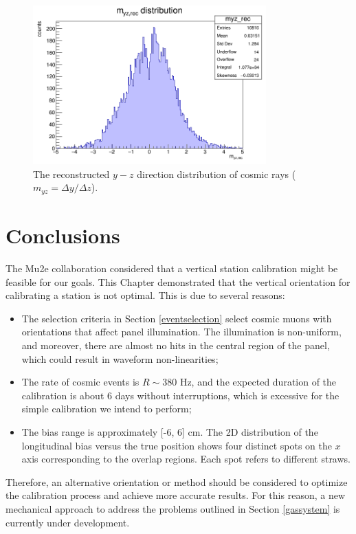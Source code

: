 \begin{figure}[!h]
    \centering
    \includegraphics[width=0.8\textwidth]{figures/png/myz_rec.png}
    \caption[The reconstructed $y-z$ direction distribution of cosmic rays.]{The reconstructed $y-z$ direction distribution of cosmic rays ($m_{yz}=\Delta y /\Delta z$).}
    \label{fig:myzrec}
\end{figure}
\section{Conclusions}
The Mu2e collaboration considered 
that a vertical station calibration might be 
feasible for our goals.
This Chapter demonstrated that the vertical orientation for calibrating a station is not optimal. This is due to several reasons:
\begin{itemize}
    \item The selection criteria in Section \ref{eventselection} select cosmic muons with orientations that affect panel illumination. 
    The illumination is non-uniform, and moreover, there are almost no hits in the central region of the panel, which could result in waveform non-linearities;
    \item The rate of cosmic events is $R \sim 380$ Hz, and the expected duration of the calibration is about 6 days without interruptions, 
    which is excessive for the simple calibration we intend to perform;
    \item The bias range is approximately [-6, 6] cm. The 2D distribution of the longitudinal bias versus the true position shows 
    four distinct spots on the $x$ axis corresponding to the overlap regions. Each spot refers to different straws.
\end{itemize}
Therefore, an alternative orientation or method should be considered to optimize the calibration process and achieve more accurate results.
For this reason, a new mechanical approach 
to address the problems outlined in Section \ref{gassystem}  
is currently under development.






